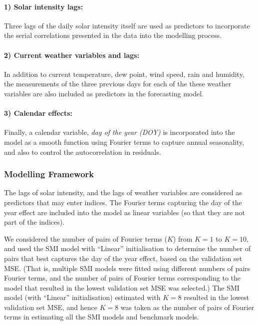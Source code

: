 \documentclass[
  11pt,
  a4paper,
]{article}
\begin{document}
\paragraph{1) Solar intensity lags:}\label{solar-intensity-lags}

Three lags of the daily solar intensity itself are used as predictors to
incorporate the serial correlations presented in the data into the
modelling process.

\paragraph{2) Current weather variables and
lags:}\label{current-weather-variables-and-lags}

In addition to current temperature, dew point, wind speed, rain and
humidity, the measurements of the three previous days for each of the
these weather variables are also included as predictors in the
forecasting model.

\paragraph{3) Calendar effects:}\label{calendar-effects-1}

Finally, a calendar variable, \emph{day of the year (DOY)} is
incorporated into the model as a smooth function using Fourier terms to
capture annual seasonality, and also to control the autocorrelation in
residuals.

\subsubsection{Modelling Framework}\label{modelling-framework-1}

The lags of solar intensity, and the lags of weather variables are
considered as predictors that may enter indices. The Fourier terms
capturing the day of the year effect are included into the model as
linear variables (so that they are not part of the indices).

We considered the number of pairs of Fourier terms (\(K\)) from
\(K = 1\) to \(K = 10\), and used the SMI model with ``Linear''
initialisation to determine the number of pairs that best captures the
day of the year effect, based on the validation set MSE. (That is,
multiple SMI models were fitted using different numbers of pairs Fourier
terms, and the number of pairs of Fourier terms corresponding to the
model that resulted in the lowest validation set MSE was selected.) The
SMI model (with ``Linear'' initialisation) estimated with \(K = 8\)
resulted in the lowest validation set MSE, and hence \(K = 8\) was taken
as the number of pairs of Fourier terms in estimating all the SMI models
and benchmark models.
\end{document}
